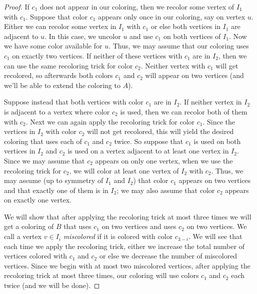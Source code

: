 \begin{proof}
If $c_1$ does not appear in our coloring, then we recolor some vertex of $I_1$
with $c_1$.
Suppose that color $c_1$ appears only once in our coloring, say on vertex $u$.
Either we can recolor some vertex in $I_1$ with $c_1$ or else both vertices in
$I_1$ are adjacent to $u$.  In this case, we uncolor $u$ and use $c_1$ on both
vertices of $I_1$.  Now we have some color available for $u$.  Thus, we may
assume that our coloring uses $c_1$ on exactly two vertices.  If neither of
these vertices with $c_1$ are in $I_2$, then we can use the same recoloring
trick for color $c_2$.  Neither vertex with $c_1$ will get recolored, so
afterwards both colors $c_1$ and $c_2$ will appear on two vertices (and we'll
be able to extend the coloring to $A$).  

Suppose instead that  both vertices with
color $c_1$ are in $I_2$. If neither vertex in $I_2$ is adjacent to a vertex
where color $c_2$ is used, then we can recolor both of them with $c_2$. 
Next we can again apply the recoloring trick for color $c_1$.  Since the
vertices in $I_2$ with color $c_2$ will not get recolored, this will yield the
desired coloring that uses each of $c_1$ and $c_2$ twice.  So suppose that $c_1$
is used on both vertices in $I_2$ and $c_2$ is used on a vertex adjacent to at
least one vertex in $I_2$.  Since we may assume that $c_2$ appears on only one
vertex, when we use the recoloring trick for $c_2$, we will color at least one
vertex of $I_2$ with $c_2$.
Thus, we may assume (up to symmetry of $I_1$ and $I_2$)
that color $c_1$ appears on two vertices and that exactly one of them is in
$I_2$; we may also assume that color $c_2$ appears on exactly one vertex.

We will show that after applying the recoloring trick at most three times we
will get a coloring of $B$ that uses $c_1$ on two vertices and uses $c_2$ on two
vertices.  We call a vertex $v\in I_i$ \textit{miscolored} if it is colored with
color $c_{3-i}$.  We will see that each time we apply the recoloring trick,
either we increase the total number of vertices colored with $c_1$ and $c_2$ or
else we decrease the number of miscolored vertices.  Since we begin with at
most two miscolored vertices, after applying the recoloring trick at most three
times, our coloring will use colors $c_1$ and $c_2$ each twice (and we will be
done).


\end{proof}
